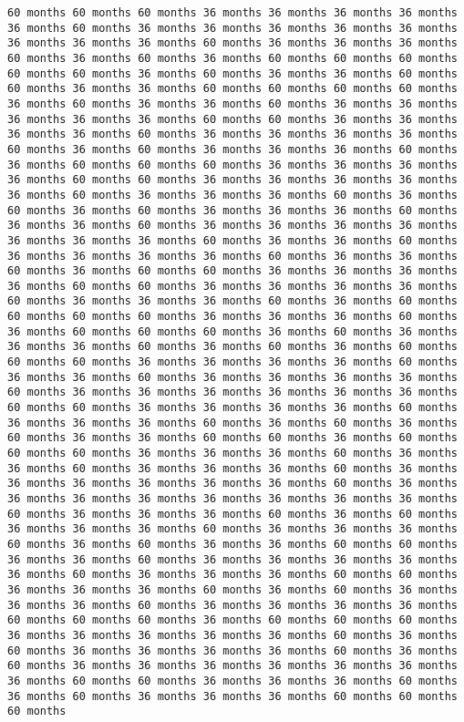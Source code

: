 \documentclass[11pt]{article}
\begin{document}
\begin{Verbatim}[commandchars=\\\{\}, frame=single, framerule=2mm, rulecolor=\color{outerrorbackground}]
60 months 60 months 60 months 36 months 36 months 36 months 36 months 36 months 60 months 36 months 36 months 36 months 36 months 36 months 36 months 36 months 36 months 60 months 36 months 36 months 36 months 60 months 36 months 60 months 36 months 60 months 60 months 60 months 60 months 60 months 36 months 60 months 36 months 36 months 60 months 60 months 36 months 36 months 60 months 60 months 60 months 60 months 36 months 60 months 36 months 36 months 60 months 36 months 36 months 36 months 36 months 36 months 60 months 60 months 36 months 36 months 36 months 36 months 60 months 36 months 36 months 36 months 36 months 60 months 36 months 60 months 36 months 36 months 36 months 60 months 36 months 60 months 60 months 60 months 36 months 36 months 36 months 36 months 60 months 60 months 36 months 36 months 36 months 36 months 36 months 60 months 36 months 36 months 36 months 60 months 36 months 60 months 36 months 60 months 36 months 36 months 36 months 60 months 36 months 36 months 60 months 36 months 36 months 36 months 36 months 36 months 36 months 36 months 60 months 36 months 36 months 60 months 36 months 36 months 36 months 36 months 60 months 36 months 36 months 60 months 36 months 60 months 60 months 36 months 36 months 36 months 36 months 60 months 60 months 36 months 36 months 36 months 36 months 60 months 36 months 36 months 36 months 60 months 36 months 60 months 60 months 60 months 60 months 36 months 36 months 36 months 60 months 36 months 60 months 60 months 60 months 36 months 60 months 36 months 36 months 36 months 60 months 36 months 60 months 36 months 60 months 60 months 60 months 36 months 36 months 36 months 36 months 60 months 36 months 36 months 60 months 36 months 36 months 36 months 36 months 60 months 36 months 36 months 36 months 36 months 36 months 36 months 60 months 60 months 36 months 36 months 36 months 36 months 60 months 36 months 36 months 36 months 60 months 36 months 60 months 36 months 60 months 36 months 36 months 60 months 60 months 36 months 60 months 60 months 60 months 36 months 36 months 36 months 60 months 36 months 36 months 60 months 36 months 36 months 36 months 60 months 36 months 36 months 36 months 36 months 36 months 36 months 60 months 36 months 36 months 36 months 36 months 36 months 36 months 36 months 36 months 60 months 36 months 36 months 36 months 60 months 36 months 60 months 36 months 36 months 36 months 60 months 36 months 36 months 36 months 60 months 36 months 60 months 36 months 36 months 60 months 60 months 36 months 36 months 60 months 36 months 36 months 36 months 36 months 36 months 60 months 36 months 36 months 36 months 60 months 60 months 36 months 36 months 36 months 60 months 36 months 60 months 36 months 36 months 36 months 60 months 36 months 36 months 36 months 36 months 60 months 60 months 60 months 36 months 60 months 60 months 60 months 36 months 36 months 36 months 36 months 36 months 60 months 36 months 60 months 36 months 36 months 36 months 36 months 60 months 36 months 60 months 36 months 36 months 36 months 36 months 36 months 36 months 36 months 60 months 60 months 36 months 36 months 36 months 60 months 36 months 60 months 36 months 36 months 36 months 60 months 60 months 60 months 
\end{Verbatim}
\end{document}
